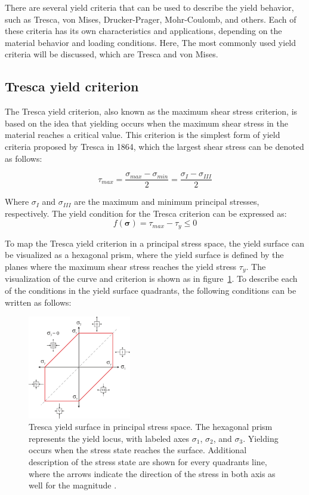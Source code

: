 \documentclass[12pt]{article}
\begin{document}
\hspace{2em}There are several yield criteria that can be used to describe the
yield behavior, such as Tresca, von Mises, Drucker-Prager, Mohr-Coulomb, and others. Each of these criteria has its own
characteristics and applications, depending on the material behavior and loading conditions. Here, The most commonly used yield
criteria will be discussed, which are Tresca and von Mises.
\subsection{Tresca yield criterion}
\hspace{2em}The Tresca yield criterion, also known as the maximum shear stress criterion, is based on the idea that
yielding occurs when the maximum shear stress in the material reaches a critical value.
This criterion is the simplest form of yield criteria proposed by Tresca in 1864, which the largest shear stress can be denoted 
as follows:

\begin{equation}
    \tau_{max} = \frac{\sigma_{max} - \sigma_{min}}{2} = \frac{\sigma_{I} - \sigma_{III}}{2}
\end{equation}

Where $\sigma_{I}$ and $\sigma_{III}$ are the maximum and minimum principal stresses, respectively. The yield condition
for the Tresca criterion can be expressed as:
\begin{equation}
    f(\boldsymbol{\sigma}) = \tau_{max} - \tau_y \leq 0
\end{equation}


To map the Tresca yield criterion in a principal stress space, the yield surface can be visualized as a hexagonal prism,
where the yield surface is defined by the planes where the maximum shear stress reaches the yield stress $\tau_y$. The visualization of the curve and 
criterion is shown as in figure~\ref{fig:tresca_surface}. To describe each of the conditions in the yield surface quadrants, the following conditions can be written as follows:
\begin{figure}[H]
    \centering
    \includegraphics[width=0.4\textwidth]{images/TrescaSurface.png}
    \caption{Tresca yield surface in principal stress space. The hexagonal prism represents the yield locus, with labeled axes $\sigma_1$, $\sigma_2$, and $\sigma_3$. 
    Yielding occurs when the stress state reaches the surface. Additional description of the stress state
    are shown for every quadrants line, where the arrows indicate the direction of the stress in both axis as well
    for the magnitude \cite{hosford2005}.}
    \label{fig:tresca_surface}
\end{figure}
\end{document}
